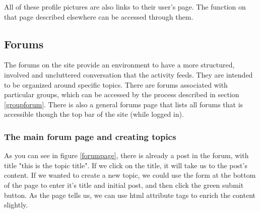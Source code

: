 \documentclass[10pt]{article}
\begin{document}
\begin{flushleft}
All of these profile pictures are also links to their user's page.  The function on that page described elsewhere can be accessed through them.
\end{flushleft}

\subsection{Forums} \label{Forums}
The forums on the site provide an environment to have a more structured, involved and uncluttered conversation that the activity feeds.  They are intended to be organized around specific topics.  There are forums associated with particular groups, which can be accessed by the process described in section \ref{groupforum}.  There is also a general forums page that lists all forums that is accessible though the top bar of the site (while logged in).  


\subsubsection{The main forum page and creating topics} \label{doggopost}
\begin{flushleft}
As you can see in figure \ref{forumpage}, there is already a post in the forum, with title "this is the topic title".  If we click on the title, it will take us to the post's content.  If we wanted to create a new topic, we could use the form at the bottom of the page to enter it's title and initial post, and then click the green submit button.  As the page tells us, we can use html attribute tags to enrich the content slightly.
\end{flushleft}
\end{document}
